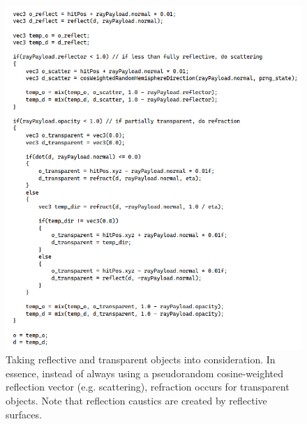 \documentclass[12pt]{article}
\begin{document}
\begin{figure} 
\centering
  \includegraphics[width = 6 in]{code.png}
  \caption{ Taking reflective and transparent objects into consideration.
In essence, instead of always using a pseudorandom cosine-weighted reflection vector (e.g. scattering), refraction occurs for transparent objects.
Note that reflection caustics are created by reflective surfaces.
}
\end{figure}
\end{document}
